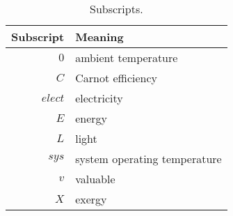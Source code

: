   
\begin{table}
\centering
\caption{Subscripts.}
\begin{tabular}{r l}
\toprule
Subscript & Meaning \\
\midrule
$0$ & ambient temperature \\
$C$ & Carnot efficiency \\
$elect$ & electricity \\
$E$ & energy \\
$L$ & light \\
$sys$ & system operating temperature \\
$v$ & valuable \\
$X$ & exergy \\
\bottomrule
\end{tabular}
\label{tab:subscripts}
\end{table}


